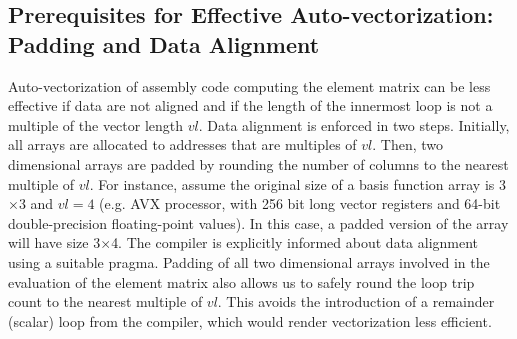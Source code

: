 \documentclass[conference]{IEEEtran}
\begin{document}
\subsection{Prerequisites for Effective Auto-vectorization: Padding and Data Alignment}
Auto-vectorization of assembly code computing the element matrix can be less effective if data are not aligned and if the length of the innermost loop is not a multiple of the vector length $vl$. Data alignment is enforced in two steps. Initially, all arrays are allocated to addresses that are multiples of $vl$. Then, two dimensional arrays are padded by rounding the number of columns to the nearest multiple of $vl$. For instance, assume the original size of a basis function array is 3$\times$3 and $vl=4$ (e.g. AVX processor, with 256 bit long vector registers and 64-bit double-precision floating-point values). In this case, a padded version of the array will have size 3$\times$4. The compiler is explicitly informed about data alignment using a suitable pragma. Padding of all two dimensional arrays involved in the evaluation of the element matrix also allows us to safely round the loop trip count to the nearest multiple of $vl$. This avoids the introduction of a remainder (scalar) loop from the compiler, which would render vectorization less efficient.

\end{document}
